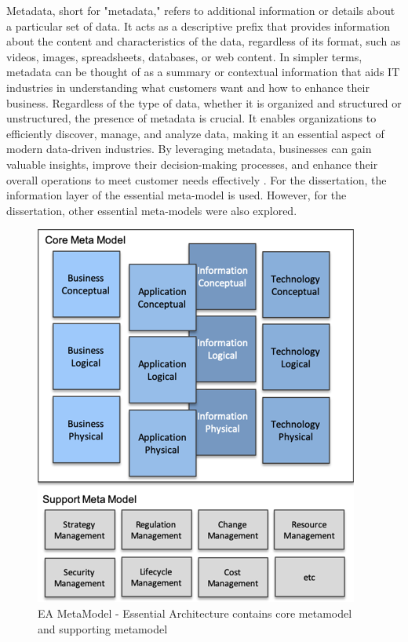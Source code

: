 \documentclass{article}
\begin{document}
Metadata, short for "metadata," refers to additional information or details about a particular set of data. It acts as a descriptive prefix that provides information about the content and characteristics of the data, regardless of its format, such as videos, images, spreadsheets, databases, or web content. In simpler terms, metadata can be thought of as a summary or contextual information that aids IT industries in understanding what customers want and how to enhance their business. Regardless of the type of data, whether it is organized and structured or unstructured, the presence of metadata is crucial. It enables organizations to efficiently discover, manage, and analyze data, making it an essential aspect of modern data-driven industries. By leveraging metadata, businesses can gain valuable insights, improve their decision-making processes, and enhance their overall operations to meet customer needs effectively \parencite{marr2021}. For the dissertation, the information layer of the essential meta-model is used. However, for the dissertation, other essential meta-models were also explored.

\begin{figure}[ht!]
    \centering
    \includegraphics[scale=0.8]{ea-meata-model}
    \caption{EA MetaModel  - 
Essential Architecture contains core metamodel and supporting metamodel }
    \label{fig:ea-metamodel}
\end{figure}
\end{document}
